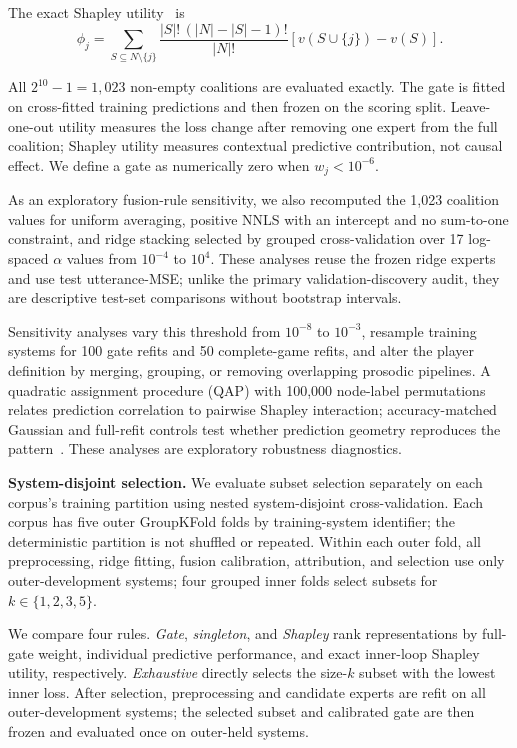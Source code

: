 \documentclass{article}
\begin{document}
The exact Shapley utility~\cite{shapley1953value} is
\begin{equation}
\phi_j
=
\sum_{S\subseteq N\setminus\{j\}}
\frac{|S|!\,(|N|-|S|-1)!}{|N|!}
\left[
v(S\cup\{j\})-v(S)
\right].
\label{eq:shapley}
\end{equation}

All $2^{10}-1=1{,}023$ non-empty coalitions are evaluated exactly. The gate is
fitted on cross-fitted training predictions and then frozen on the scoring
split. Leave-one-out utility measures the loss change after removing one
expert from the full coalition; Shapley utility measures contextual predictive
contribution, not causal effect. We define a gate as numerically zero when
$w_j<10^{-6}$.

As an exploratory fusion-rule sensitivity, we also recomputed the 1{,}023
coalition values for uniform averaging, positive NNLS with an intercept and no
sum-to-one constraint, and ridge stacking selected by grouped cross-validation
over 17 log-spaced $\alpha$ values from $10^{-4}$ to $10^4$. These analyses
reuse the frozen ridge experts and use test utterance-MSE; unlike the primary
validation-discovery audit, they are descriptive test-set comparisons without
bootstrap intervals.

Sensitivity analyses vary this threshold from $10^{-8}$ to $10^{-3}$, resample
training systems for 100 gate refits and 50 complete-game refits, and alter the
player definition by merging, grouping, or removing overlapping prosodic
pipelines. A quadratic assignment procedure (QAP) with 100{,}000 node-label
permutations relates prediction correlation to pairwise Shapley interaction;
accuracy-matched Gaussian and full-refit controls test whether prediction
geometry reproduces the pattern~\cite{grabisch1999interaction,krackhardt1988qap}.
These analyses are exploratory robustness diagnostics.

\noindent\textbf{System-disjoint selection.}
We evaluate subset selection separately on each corpus's training partition
using nested system-disjoint cross-validation. Each corpus has five outer
GroupKFold folds by training-system identifier; the deterministic partition is
not shuffled or repeated. Within each outer fold, all preprocessing, ridge fitting, fusion
calibration, attribution, and selection use only outer-development systems;
four grouped inner folds select subsets for $k\in\{1,2,3,5\}$.

We compare four rules. \emph{Gate}, \emph{singleton}, and \emph{Shapley} rank
representations by full-gate weight, individual predictive performance, and
exact inner-loop Shapley utility, respectively. \emph{Exhaustive} directly
selects the size-$k$ subset with the lowest inner loss. After selection,
preprocessing and candidate experts are refit on all outer-development systems;
the selected subset and calibrated gate are then frozen and evaluated once on
outer-held systems.
\end{document}

